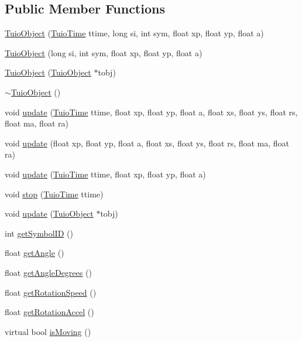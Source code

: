 \subsection*{Public Member Functions}
\begin{DoxyCompactItemize}
\item 
\hyperlink{class_t_u_i_o_1_1_tuio_object_a25b1ce53c045514fcef6c99afc23ca26}{Tuio\+Object} (\hyperlink{class_t_u_i_o_1_1_tuio_time}{Tuio\+Time} ttime, long si, int sym, float xp, float yp, float a)
\item 
\hyperlink{class_t_u_i_o_1_1_tuio_object_a4d37dea1366bcf6c049a3bb5fca89826}{Tuio\+Object} (long si, int sym, float xp, float yp, float a)
\item 
\hyperlink{class_t_u_i_o_1_1_tuio_object_a0fda9e276bf5585227c1eb5df35749cf}{Tuio\+Object} (\hyperlink{class_t_u_i_o_1_1_tuio_object}{Tuio\+Object} $\ast$tobj)
\item 
\hyperlink{class_t_u_i_o_1_1_tuio_object_aa9cde21ddda361193c556dbeb8433de0}{$\sim$\+Tuio\+Object} ()
\item 
void \hyperlink{class_t_u_i_o_1_1_tuio_object_a8aff2aa3004d1558f0db6e95889df6e8}{update} (\hyperlink{class_t_u_i_o_1_1_tuio_time}{Tuio\+Time} ttime, float xp, float yp, float a, float xs, float ys, float rs, float ma, float ra)
\item 
void \hyperlink{class_t_u_i_o_1_1_tuio_object_a74ddebcce83c2a19908082ca3514d599}{update} (float xp, float yp, float a, float xs, float ys, float rs, float ma, float ra)
\item 
void \hyperlink{class_t_u_i_o_1_1_tuio_object_aaa516e0bc2c7bf5ed9ed3f94f0cb86df}{update} (\hyperlink{class_t_u_i_o_1_1_tuio_time}{Tuio\+Time} ttime, float xp, float yp, float a)
\item 
void \hyperlink{class_t_u_i_o_1_1_tuio_object_a4b30f602dc66829d9c23a7a19a8ae9fa}{stop} (\hyperlink{class_t_u_i_o_1_1_tuio_time}{Tuio\+Time} ttime)
\item 
void \hyperlink{class_t_u_i_o_1_1_tuio_object_adcab9222c081ac997c11a2e7e50a965c}{update} (\hyperlink{class_t_u_i_o_1_1_tuio_object}{Tuio\+Object} $\ast$tobj)
\item 
int \hyperlink{class_t_u_i_o_1_1_tuio_object_a0d0b9b6e48c657350559acded6a1e53b}{get\+Symbol\+ID} ()
\item 
float \hyperlink{class_t_u_i_o_1_1_tuio_object_a7757d3c07bb7014f50bc645016d58933}{get\+Angle} ()
\item 
float \hyperlink{class_t_u_i_o_1_1_tuio_object_a57986baeb2c669106cafb8c66a7a3cce}{get\+Angle\+Degrees} ()
\item 
float \hyperlink{class_t_u_i_o_1_1_tuio_object_af2257dc8331077f50a618cc61474bf81}{get\+Rotation\+Speed} ()
\item 
float \hyperlink{class_t_u_i_o_1_1_tuio_object_a228d923c770dd1fe767ea5899c1258b6}{get\+Rotation\+Accel} ()
\item 
virtual bool \hyperlink{class_t_u_i_o_1_1_tuio_object_a9239541cb79607ed7a08b2c924655a7b}{is\+Moving} ()
\end{DoxyCompactItemize}
